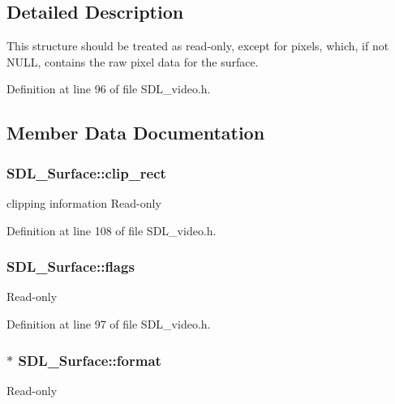 \subsection{Detailed Description}
This structure should be treated as read-\/only, except for \textquotesingle{}pixels\textquotesingle{}, which, if not N\+U\+L\+L, contains the raw pixel data for the surface. 

Definition at line 96 of file S\+D\+L\+\_\+video.\+h.



\subsection{Member Data Documentation}
\hypertarget{struct_s_d_l___surface_aa9a0da3b38261dad6cf0cc4e3bb5b0c3}{}
\subsubsection[{clip\+\_\+rect}]{ S\+D\+L\+\_\+\+Surface\+::clip\+\_\+rect}\label{struct_s_d_l___surface_aa9a0da3b38261dad6cf0cc4e3bb5b0c3}
clipping information Read-\/only 

Definition at line 108 of file S\+D\+L\+\_\+video.\+h.

\hypertarget{struct_s_d_l___surface_a86d78b665d5dfd7aa1dd9696b067641b}{}
\subsubsection[{flags}]{ S\+D\+L\+\_\+\+Surface\+::flags}\label{struct_s_d_l___surface_a86d78b665d5dfd7aa1dd9696b067641b}
Read-\/only 

Definition at line 97 of file S\+D\+L\+\_\+video.\+h.

\hypertarget{struct_s_d_l___surface_a0a90721f947c10c3b79e02ccb419ca62}{}
\subsubsection[{format}]{$\ast$ S\+D\+L\+\_\+\+Surface\+::format}\label{struct_s_d_l___surface_a0a90721f947c10c3b79e02ccb419ca62}
Read-\/only 

